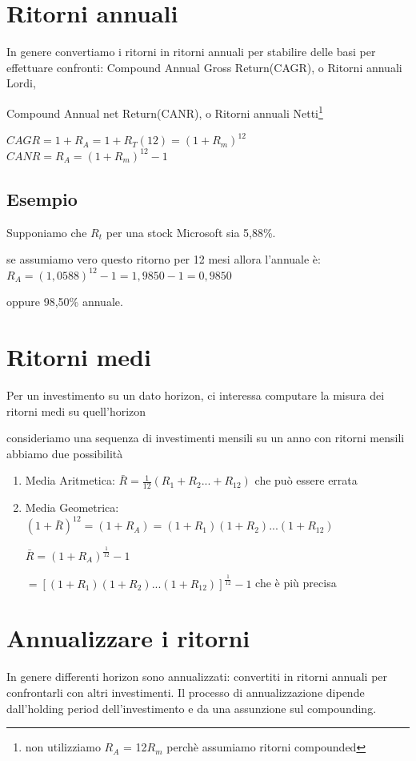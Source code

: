 \documentclass[a4paper,11pt]{report}
\begin{document}
{%
\section{Ritorni annuali}
	In genere convertiamo i ritorni in ritorni annuali per stabilire delle basi per effettuare confronti:
	Compound Annual Gross Return(CAGR), o Ritorni annuali Lordi,

	Compound Annual net Return(CANR), o Ritorni annuali Netti\footnote{non utilizziamo $R_A$ = 12$R_m$ perchè assumiamo ritorni compounded}
\begin{center}
	$CAGR = 1+R_A = 1+R_T(12) = (1+R_m)^{12} $ \\
	$CANR = R_A = (1+R_m)^12 - 1 $ \\
\end{center}
\subsection{Esempio}
	Supponiamo che $R_t$ per una stock Microsoft sia 5,88\%.

	se assumiamo vero questo ritorno per 12 mesi allora l'annuale è: \newline
	$R_A = (1,0588)^12 - 1 = 1,9850 - 1 = 0,9850 $ 

	oppure 98,50\% annuale.
\section{Ritorni medi}
	Per un investimento su un dato horizon, ci interessa computare la misura dei ritorni medi su quell'horizon

	consideriamo una sequenza di investimenti mensili su un anno con ritorni mensili abbiamo due possibilità
\begin{enumerate}
	\item Media Aritmetica: $ \bar{R} = {\frac {1}{12}}(R_1 + R_2 ... + R_12) $ che può essere errata
	\item Media Geometrica: $(1+ \bar{R})^{12} = (1+R_A) = (1+R_1)(1+R_2)...(1+R_{12}) $

		$ \bar{R} = (1+R_A)^{\frac {1}{12}} - 1$

		$ =[(1+R_1)(1+R_2)...(1+R_{12})]^{\frac{1}{12}} - 1$ che è più precisa

\end {enumerate}

\section{Annualizzare i ritorni}
	In genere differenti horizon sono annualizzati: convertiti in ritorni annuali per confrontarli con altri investimenti. \newline
	Il processo di annualizzazione dipende dall'holding period dell'investimento e da una assunzione sul compounding.

}
\end{document}

